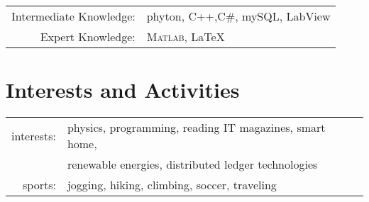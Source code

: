 \documentclass[a4paper,10pt]{article}
\begin{document}
\begin{tabular}{rl}
Intermediate Knowledge: &  phyton, \textsc{C}++,\textsc{C\#}, my\textsc{SQL}, LabView\\
Expert Knowledge: & \textsc{Matlab}, \LaTeX\ \\
\end{tabular}


\vspace{0.5cm}

\section{Interests and Activities}
\begin{tabular}{rl}
interests: & physics, programming, reading IT magazines, smart home,\\
& renewable energies, distributed ledger technologies\\
sports: & jogging, hiking, climbing, soccer, traveling
\end{tabular}
\end{document}
